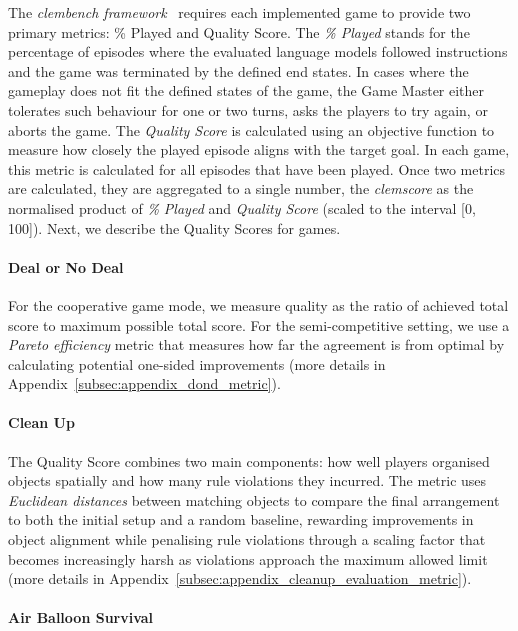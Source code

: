 \documentclass[11pt]{article}
\begin{document}
The \textit{clembench framework}~\cite{chalamalasetti-etal-2023-clembench} requires each implemented game to provide two primary metrics: \% Played and Quality Score. The \textit{\% Played} stands for the percentage of episodes where the evaluated language models followed instructions and the game was terminated by the defined end states. In cases where the gameplay does not fit the defined states of the game, the Game Master either tolerates such behaviour for one or two turns, asks the players to try again, or aborts the game. The \textit{Quality Score} is calculated using an objective function to measure how closely the played episode aligns with the target goal. In each game, this metric is calculated for all episodes that have been played. Once two metrics are calculated, they are aggregated to a single number, the \textit{clemscore} as the normalised product of \textit{\% Played} and \textit{Quality Score} (scaled to the interval [0, 100]). Next, we describe the Quality Scores for games.

\paragraph{Deal or No Deal}

For the cooperative game mode, we measure quality as the ratio of achieved total score to maximum possible total score. For the semi-competitive setting, we use a \textit{Pareto efficiency} metric that measures how far the agreement is from optimal by calculating potential one-sided improvements (more details in Appendix~\ref{subsec:appendix_dond_metric}).

\paragraph{Clean Up}

The Quality Score combines two main components: how well players organised objects spatially and how many rule violations they incurred. The metric uses \textit{Euclidean distances} between matching objects to compare the final arrangement to both the initial setup and a random baseline, rewarding improvements in object alignment while penalising rule violations through a scaling factor that becomes increasingly harsh as violations approach the maximum allowed limit 
(more details in Appendix~\ref{subsec:appendix_cleanup_evaluation_metric}).



\paragraph{Air Balloon Survival}
\end{document}

